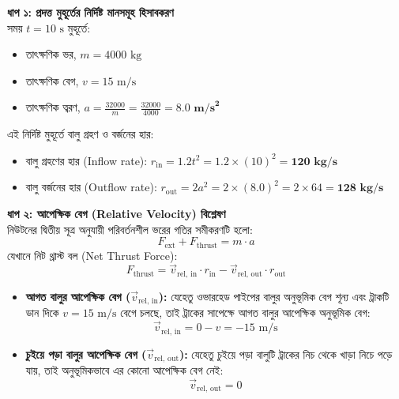 \documentclass[12pt, a4paper]{article}
\begin{document}
\begin{tcolorbox}[solutionbox={সমাধান (Solution)}]
\noindent
\textbf{ধাপ ১: প্রদত্ত মুহূর্তের নির্দিষ্ট মানসমূহ হিসাবকরণ} \\
সময় $t = 10\text{ s}$ মুহূর্তে:
\begin{itemize}[leftmargin=*, parsep=0.3ex]
    \item তাৎক্ষণিক ভর, $m = 4000\text{ kg}$
    \item তাৎক্ষণিক বেগ, $v = 15\text{ m/s}$
    \item তাৎক্ষণিক ত্বরণ, $a = \frac{32000}{m} = \frac{32000}{4000} = \mathbf{8.0\text{ m/s}^2}$
\end{itemize}

এই নির্দিষ্ট মুহূর্তে বালু গ্রহণ ও বর্জনের হার:
\begin{itemize}[leftmargin=*, parsep=0.3ex]
    \item বালু গ্রহণের হার (Inflow rate): $r_{\text{in}} = 1.2 t^2 = 1.2 \times (10)^2 = \mathbf{120\text{ kg/s}}$
    \item বালু বর্জনের হার (Outflow rate): $r_{\text{out}} = 2 a^2 = 2 \times (8.0)^2 = 2 \times 64 = \mathbf{128\text{ kg/s}}$
\end{itemize}

\vspace{0.5em}
\noindent
\textbf{ধাপ ২: আপেক্ষিক বেগ (Relative Velocity) বিশ্লেষণ} \\
নিউটনের দ্বিতীয় সূত্র অনুযায়ী পরিবর্তনশীল ভরের গতির সমীকরণটি হলো:
$$F_{\text{ext}} + F_{\text{thrust}} = m \cdot a$$
যেখানে নিট থ্রাস্ট বল (Net Thrust Force):
$$F_{\text{thrust}} = \vec{v}_{\text{rel, in}} \cdot r_{\text{in}} - \vec{v}_{\text{rel, out}} \cdot r_{\text{out}}$$

\begin{itemize}[leftmargin=*, parsep=0.3ex]
    \item \textbf{আগত বালুর আপেক্ষিক বেগ ($\vec{v}_{\text{rel, in}}$):} যেহেতু ওভারহেড পাইপের বালুর অনুভূমিক বেগ শূন্য এবং ট্রাকটি ডান দিকে $v = 15\text{ m/s}$ বেগে চলছে, তাই ট্রাকের সাপেক্ষে আগত বালুর আপেক্ষিক অনুভূমিক বেগ:
    $$\vec{v}_{\text{rel, in}} = 0 - v = -15\text{ m/s}$$
    \item \textbf{চুইয়ে পড়া বালুর আপেক্ষিক বেগ ($\vec{v}_{\text{rel, out}}$):} যেহেতু চুইয়ে পড়া বালুটি ট্রাকের নিচ থেকে খাড়া নিচে পড়ে যায়, তাই অনুভূমিকভাবে এর কোনো আপেক্ষিক বেগ নেই:
    $$\vec{v}_{\text{rel, out}} = 0$$
\end{itemize}


\end{tcolorbox}
\end{document}
